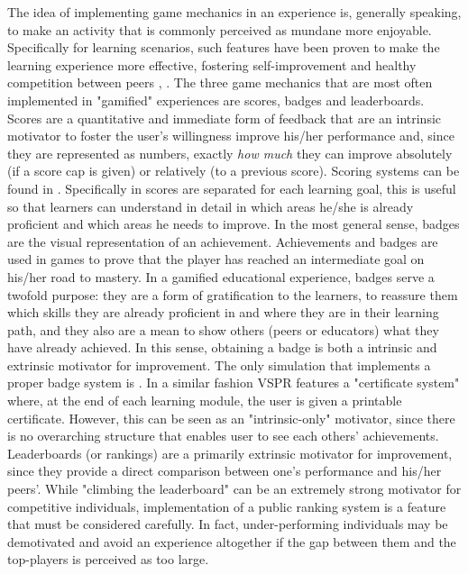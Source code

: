The idea of implementing game mechanics in an experience is, generally speaking, to make an activity that is commonly perceived as mundane more enjoyable. 
Specifically for learning scenarios, such features have been proven to make the learning experience more effective, fostering self-improvement and healthy competition between peers \cite{festinger1954theory}, \cite{benedict2013promotion}. 
The three game mechanics that are most often implemented in "gamified" experiences are scores, badges and leaderboards. 
Scores are a quantitative and immediate form of feedback that are an intrinsic motivator to foster the user's willingness improve his/her performance and, since they are represented as numbers, exactly \emph{how much} they can improve absolutely (if a score cap is given) or relatively (to a previous score). Scoring systems can be found in \cite{guetterman2019medical,dupuy2019virtual,jeuring2015communicate,schoenthaler2017simulated,zielke2015beyond}. Specifically in \cite{jeuring2015communicate,schoenthaler2017simulated} scores are separated for each learning goal, this is useful so that learners can understand in detail in which areas he/she is already proficient and which areas he needs to improve.
In the most general sense, badges are the visual representation of an achievement. Achievements and badges are used in games to prove that the player has reached an intermediate goal on his/her road to mastery. In a gamified educational experience, badges serve a twofold purpose: they are a form of gratification to the learners, to reassure them which skills they are already proficient in and where they are in their learning path, and they also are a mean to show others (peers or educators) what they have already achieved. In this sense, obtaining a badge is both a intrinsic and extrinsic motivator for improvement.
The only simulation that implements a proper badge system is \cite{zielke2016beyond}. In a similar fashion VSPR \cite{peddle2019development} features a "certificate system" where, at the end of each learning module, the user is given a printable certificate. However, this can be seen as an "intrinsic-only" motivator, since there is no overarching structure that enables user to see each others' achievements.
Leaderboards (or rankings) are a primarily extrinsic motivator for improvement, since they provide a direct comparison between one's performance and his/her peers'. While "climbing the leaderboard" can be an extremely strong motivator for competitive individuals, implementation of a public ranking system is a feature that must be considered carefully. In fact, under-performing individuals may be demotivated and avoid an experience altogether if the gap between them and the top-players is perceived as too large.
